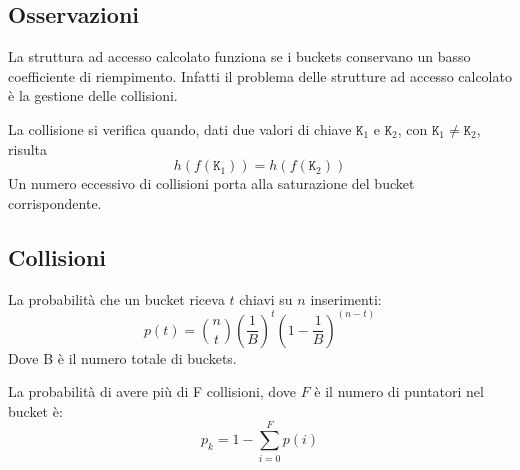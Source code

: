 \documentclass[oneside,a4paper,11pt]{book}
\theoremstyle{italicstyle}
\theoremstyle{normStyle}
\begin{document}
\subsection{Osservazioni}
La struttura ad accesso calcolato funziona se i buckets conservano un basso coefficiente 
di riempimento. Infatti il problema delle strutture ad accesso calcolato è la 
gestione delle collisioni.

La collisione si verifica quando, dati due valori di chiave $\texttt{K}_1$ e $\texttt{K}_2$, con 
$\texttt{K}_1 \neq \texttt{K}_2$, risulta
\[
  h(f(\texttt{K}_1)) = h(f(\texttt{K}_2))
\]
Un numero eccessivo di collisioni porta alla saturazione del bucket corrispondente.
\subsection{Collisioni}
La probabilità che un bucket riceva $t$ chiavi su $n$ inserimenti:
\[
  p(t) = \binom{n}{t}\left( \frac{1}{B} \right) ^t \left( 1 - \frac{1}{B}\right)^{(n-t)}
\]
Dove B è il numero totale di buckets.

La probabilità di avere più di F collisioni, dove $F$ è il numero di puntatori 
nel bucket è:
\[
  p_k = 1 - \sum_{i=0}^{F}p(i)
\]
\end{document}
